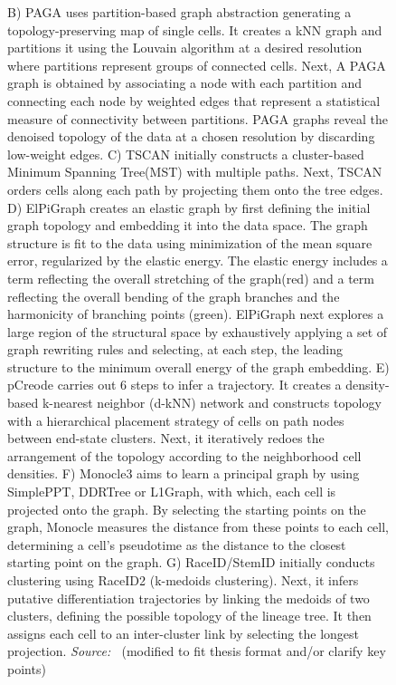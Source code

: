 \begin{figure}[t!]
  \caption{
	B) PAGA uses partition-based graph abstraction generating a topology-preserving map of single cells. It creates a kNN graph and partitions it using the Louvain algorithm at a desired resolution where partitions represent groups of connected cells. Next, A PAGA graph is obtained by associating a node with each partition and connecting each node by weighted edges that represent a statistical measure of connectivity between partitions. PAGA graphs reveal the denoised topology of the data at a chosen resolution by discarding low-weight edges.
	C) TSCAN initially constructs a cluster-based Minimum Spanning Tree(MST) with multiple paths. Next, TSCAN orders cells along each path by projecting them onto the tree edges. 
	D) ElPiGraph creates an elastic graph by first defining the initial graph topology and embedding it into the data space. The graph structure is fit to the data using minimization of the mean square error, regularized by the elastic energy. The elastic energy includes a term reflecting the overall stretching of the graph(red) and a term reflecting the overall bending of the graph branches and the harmonicity of branching points (green). ElPiGraph next explores a large region of the structural space by exhaustively applying a set of graph rewriting rules and selecting, at each step, the leading structure to the minimum overall energy of the graph embedding.
	E) pCreode carries out 6 steps to infer a trajectory. It creates a density-based k-nearest neighbor (d-kNN) network and constructs topology with a hierarchical placement strategy of cells on path nodes between end-state clusters. Next, it iteratively redoes the arrangement of the topology according to the neighborhood cell densities.
	F) Monocle3 aims to learn a principal graph by using SimplePPT, DDRTree or L1Graph, with which, each cell is projected onto the graph. By selecting the starting points on the graph, Monocle measures the distance from these points to each cell, determining a cell's pseudotime as the distance to the closest starting point on the graph.
	G) RaceID/StemID initially conducts clustering using RaceID2 (k-medoids clustering). Next, it infers putative differentiation trajectories by linking the medoids of two clusters, defining the possible topology of the lineage tree. It then assigns each cell to an inter-cluster link by selecting the longest projection.
	\emph{Source: ~\cite{chen2019stream, wolf2019paga,ji2016tscan,albergante2020ElPiGraph,herring2018pCreode,street2018slingshot,cao2019monocle3,grun2016stemid}}(modified to fit thesis format and/or clarify key points)}%
\end{figure}

